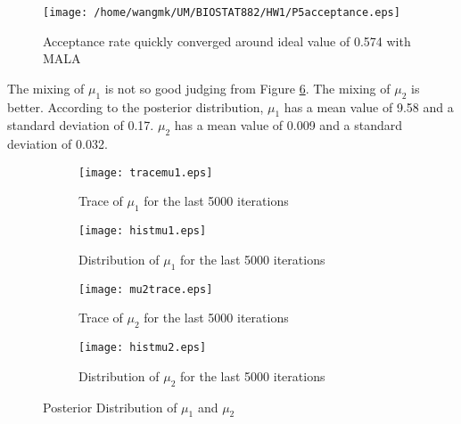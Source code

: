 \documentclass[12pt]{article}
\begin{document}
\begin{figure}[htbp]
	\centering
	\texttt{[image: /home/wangmk/UM/BIOSTAT882/HW1/P5acceptance.eps]}
	\caption{Acceptance rate quickly converged around ideal value of 0.574 with MALA}\label{p5acceptance}
\end{figure}

The mixing of $\mu_1$ is not so good judging from Figure \ref{p5mixing}. The mixing of $\mu_2$ is better. According to the posterior distribution, $\mu_1$ has a mean value of 9.58 and a standard deviation of 0.17. $\mu_2$ has a mean value of 0.009 and a standard deviation of 0.032.

\begin{figure}[htbp]
	\begin{subfigure}[b]{0.45\columnwidth}
		\texttt{[image: tracemu1.eps]}
		\caption{Trace of $\mu_1$ for the last 5000 iterations}
		\label{tracemu1}
	\end{subfigure}
	\hfill 
	\begin{subfigure}[b]{0.45\columnwidth}
		\texttt{[image: histmu1.eps]}
		\caption{Distribution of $\mu_1$ for the last 5000 iterations}
		\label{histmu1}
	\end{subfigure}
	\begin{subfigure}[b]{0.45\columnwidth}
		\texttt{[image: mu2trace.eps]}
		\caption{Trace of $\mu_2$ for the last 5000 iterations}
		\label{tracemu2}
	\end{subfigure}
	\hfill 
	\begin{subfigure}[b]{0.45\columnwidth}
		\texttt{[image: histmu2.eps]}
		\caption{Distribution of $\mu_2$ for the last 5000 iterations}
		\label{histmu2}
	\end{subfigure}
	
	\caption{Posterior Distribution of $\mu_1$ and $\mu_2$}\label{p5mixing}
\end{figure}
\end{document}
